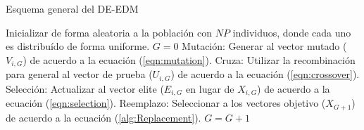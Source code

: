 \begin{algorithm}[t]
  \scriptsize
	\caption{Esquema general del DE-EDM} 
	\begin{algorithmic}[1]
	\STATE Inicializar de forma aleatoria a la población con $NP$ individuos, donde cada uno es distribuído de forma uniforme.
	\STATE $G=0$
		\STATE Mutación: Generar al vector mutado ($V_{i,G}$) de acuerdo a la ecuación (\ref{eqn:mutation}).
		\STATE Cruza: Utilizar la recombinación para general al vector de prueba ($U_{i,G}$) de acuerdo a la ecuación (\ref{eqn:crossover}).
		\STATE Selección: Actualizar al vector elite ($E_{i,G}$ en lugar de $X_{i,G}$) de acuerdo a la ecuación (\ref{eqn:selection}).
	   \ENDFOR
		\STATE Reemplazo: Seleccionar a los vectores objetivo ($X_{G+1}$) de acuerdo a la ecuación (\ref{alg:Replacement}).
	   \STATE $G=G+1$
	\ENDWHILE
\end{algorithmic}
    \label{alg:DEEDM}
\end{algorithm}


